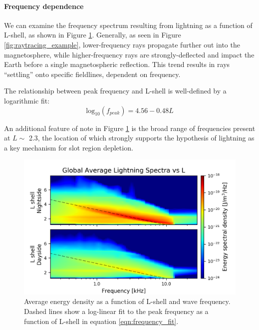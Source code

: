 \paragraph{Frequency dependence}
We can examine the frequency spectrum resulting from lightning as a function of L-shell, as shown in Figure \ref{fig:energy_density_vs_L_vs_freq}. Generally, as seen in Figure \ref{fig:raytracing_example}, lower-frequency rays propagate further out into the magnetosphere, while higher-frequency rays are strongly-deflected and impact the Earth before a single magnetospheric reflection. This trend results in rays ``settling'' onto specific fieldlines, dependent on frequency.

The relationship between peak frequency and L-shell is well-defined by a logarithmic fit:
\begin{equation}
\label{eqn:frequency_fit}
\mathrm{log}_{10}(f_{peak}) = 4.56 - 0.48 L
\end{equation}

An additional feature of note in Figure \ref{fig:energy_density_vs_L_vs_freq} is the broad range of frequencies present at $L \sim$ 2.3, the location of which strongly supports the hypothesis of lightning as a key mechanism for slot region depletion. 
\begin{figure}[hb]
\begin{center}
\includegraphics{figures/lightning_spectra_vs_L_logscale.png}
\caption[Average energy density vs L and frequency]{Average energy density as a function of L-shell and wave frequency. Dashed lines show a log-linear fit to the peak frequency as a function of L-shell in equation \eqref{eqn:frequency_fit}.}
\label{fig:energy_density_vs_L_vs_freq}
\end{center}
\end{figure}











